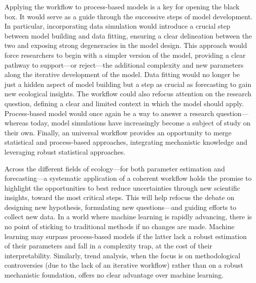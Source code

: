 \documentclass[11pt]{article}
\begin{document}
Applying the workflow to process-based models is a key for opening the black box. It would serve as a guide through the successive steps of model development. In particular, incorporating data simulation would introduce a crucial step between model building and data fitting, ensuring a clear delineation between the two and exposing strong degeneracies in the model design. This approach would force researchers to begin with a simpler version of the model, providing a clear pathway to support---or reject---the additional complexity and new parameters along the iterative development of the model.
Data fitting would no longer be just a hidden aspect of model building but a step as crucial as forecasting to gain new ecological insights. The workflow could also refocus attention on the research question, defining a clear and limited context in which the model should apply.
Process-based model would once again be a way to answer a research question---whereas today, model simulations have increasingly become a subject of study on their own. Finally, an universal workflow provides an opportunity to merge statistical and process-based approaches, integrating mechanistic knowledge and leveraging robust statistical approaches.

Across the different fields of ecology---for both parameter estimation and forecasting---a systematic application of a coherent workflow holds the promise to highlight the opportunities to best reduce uncertainties through new scientific insights, toward the most critical steps. This will help refocus the debate on designing new hypothesis, formulating new questions---and guiding efforts to collect new data. 
In a world where machine learning is rapidly advancing, there is no point of sticking to traditional methods if no changes are made. Machine learning may surpass process-based models if the latter lack a robust estimation of their parameters and fall in a complexity trap, at the cost of their interpretability. Similarly, trend analysis, when the focus is on methodological controversies (due to the lack of an iterative workflow) rather than on a robust mechanistic foundation, offers no clear advantage over machine learning.
\end{document}
